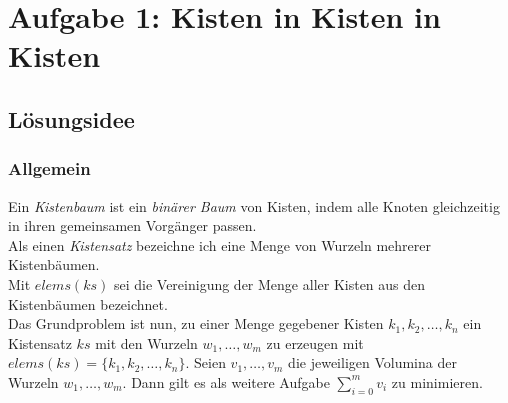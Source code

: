 \section{Aufgabe 1: Kisten in Kisten in Kisten}
\subsection{Lösungsidee}
\subsubsection{Allgemein}
Ein \emph{Kistenbaum} ist ein \emph{binärer Baum} von Kisten, indem alle Knoten gleichzeitig in ihren gemeinsamen Vorgänger passen.\\
Als einen \emph{Kistensatz} bezeichne ich eine Menge von Wurzeln mehrerer Kistenbäumen. \\
Mit \emph{$elems(ks)$} sei die Vereinigung der Menge aller Kisten aus den Kistenbäumen bezeichnet. \\
Das Grundproblem ist nun, zu einer Menge gegebener Kisten $k_1,k_2,\dots,k_n$
ein Kistensatz $ks$ mit den Wurzeln $w_1,\dots,w_m$ zu erzeugen mit $elems(ks) = \{k_1,k_2,\dots,k_n\}$.
Seien $v_1,\dots,v_m$ die jeweiligen Volumina der Wurzeln $w_1,\dots,w_m$.
Dann gilt es als weitere Aufgabe $\sum_{i=0}^{m}{v_i}$ zu minimieren.
